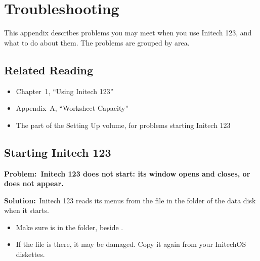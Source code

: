 \chapter{Troubleshooting}

This appendix describes problems you may meet when you use Initech 123, and
what to do about them.  The problems are grouped by area.

\section{Related Reading}
\begin{itemize}
\item Chapter~1, ``Using Initech 123''
\item Appendix~A, ``Worksheet Capacity''
\item The  part of the Setting Up volume,
  for problems starting Initech 123
\end{itemize}

\newcommand\Problem[1]{\par\addvspace{8pt}\noindent\textbf{Problem:\ #1}\par\nobreak\vspace{2pt}}
\newcommand\Solution{\noindent\textbf{Solution:}\ }

\section{Starting Initech 123}
\Problem{Initech 123 does not start: its window opens and closes, or does not
appear.}
\Solution Initech 123 reads its menus from the file  in the
 folder of the data disk when it starts.
\begin{itemize}
\item Make sure  is in the  folder, beside
  .
\item If the file is there, it may be damaged.  Copy it again from your
  InitechOS diskettes.
\end{itemize}

